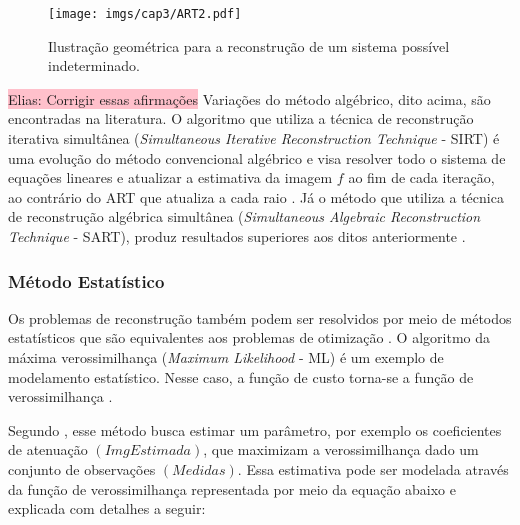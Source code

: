 {{\begin{figure}[H]
	\caption{Ilustração geométrica para a reconstrução de um sistema possível indeterminado.}
	\begin{center}
		\texttt{[image: imgs/cap3/ART2.pdf]}
	\end{center}
	\label{fig:imgCap3ARTIndeterminado}
\end{figure}

\colorbox{pink}{Elias: Corrigir essas afirmações} Variações do método algébrico, dito acima, são encontradas na literatura. O algoritmo que utiliza a técnica de reconstrução iterativa simultânea (\textit{Simultaneous Iterative Reconstruction Technique} - \acs{SIRT}) é uma evolução do método convencional algébrico e visa resolver todo o sistema de equações lineares e atualizar a estimativa da imagem $f$ ao fim de cada iteração, ao contrário do \acs{ART} que atualiza a cada raio \cite{yang2012numerical,zeng2010medical}. Já o método que utiliza a técnica de reconstrução algébrica simultânea (\textit{Simultaneous Algebraic Reconstruction Technique} - \acs{SART}), produz resultados superiores aos ditos anteriormente \cite{levakhina2014three,yang2012numerical}.   


\subsubsection{Método Estatístico}\label{MétodoEstatístico}

Os problemas de reconstrução também podem ser resolvidos por meio de métodos estatísticos que são equivalentes aos problemas de otimização \cite[p. 79]{levakhina2014three}. O algoritmo da máxima verossimilhança (\textit{Maximum Likelihood} - \acs{ML}) é um exemplo de modelamento estatístico. Nesse caso, a função de custo torna-se a função de verossimilhança \cite[p. 77]{levakhina2014three}.

Segundo , esse método busca estimar um parâmetro, por exemplo os coeficientes de atenuação $(ImgEstimada)$, que maximizam a verossimilhança dado um conjunto de observações $(Medidas)$. Essa estimativa pode ser modelada através da função de verossimilhança representada por meio da equação abaixo e explicada com detalhes a seguir:

}}
